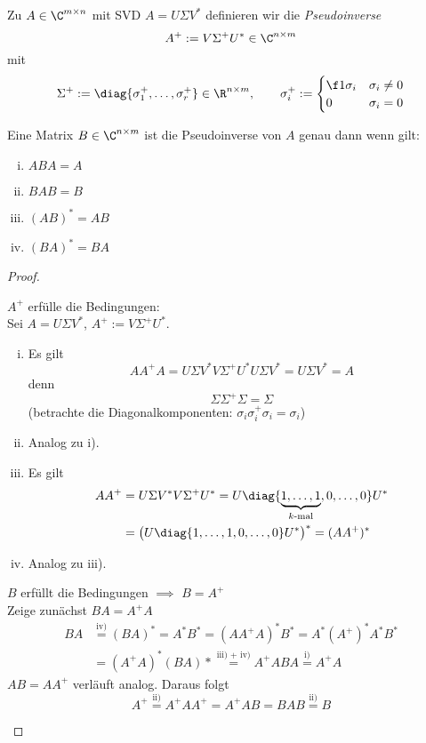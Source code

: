 \documentclass[11pt]{scrbook}
\begin{document}
\begin{df}[Pseudoinverse]
	\label{1.39}	
	Zu $A\in \C^{m\times n}$ mit SVD $A=U\Sigma V^*$ definieren wir die \emph{Pseudoinverse}
	\[
		A^+ := V \Sigma^+ U^* \in \C^{n\times m}
	\]
	mit
	\[
		\Sigma^+ := \diag\{\sigma_1^+,\dotsc, \sigma_r^+\} \in \R^{n\times m}
		,\qquad \sigma_i^+ := \begin{cases}
			\f 1{\sigma_i}	& \sigma_i \neq 0 \\
			0 & \sigma_i = 0
		\end{cases}
	\]
\end{df}

\begin{st}
	\label{1.40}
	Eine Matrix $B\in \C^{n\times m}$ ist die Pseudoinverse von $A$ genau dann wenn gilt:
	\begin{enumerate}[i)]
		\item
			$ABA = A$
		\item
			$BAB = B$
		\item
			$(AB)^* = AB$
		\item
			$(BA)^* = BA$
	\end{enumerate}
	\begin{proof}
		\begin{seg}{$A^+$ erfülle die Bedingungen:} \\
			Sei $A=U\Sigma V^*$, $A^+ := V\Sigma^+U^*$.
			\begin{enumerate}[i)]
				\item
					Es gilt
					\[
						AA^+A = U\Sigma V^* V \Sigma^+ U^* U \Sigma V^* = U\Sigma V^* = A
					\]
					denn
					\[
						\Sigma \Sigma^+ \Sigma = \Sigma
					\]
					(betrachte die Diagonalkomponenten: $\sigma_i \sigma_i^+ \sigma_i = \sigma_i$)
				\item
					Analog zu i).
				\item
					Es gilt
					\begin{align*}
						AA^+ &= U \Sigma V^* V \Sigma^+ U^* = U \diag\{\underbrace{1,\dotsc,1}_{k\text{-mal}},0,\dotsc, 0\} U^*\\ &= \big(U \diag\{1,\dotsc,1,0,\dotsc,0\} U^*\big)^* = (AA^+)^*
					\end{align*}
				\item
					Analog zu iii).
			\end{enumerate}
		\end{seg}
		\begin{seg}{$B$ erfüllt die Bedingungen $\implies$ $B=A^+$} \\
			Zeige zunächst $BA=A^+A$
			\begin{align*}
				BA &\stackrel{\text{iv)}}= (BA)^* = A^*B^* = (AA^+A)^*B^* = A^*(A^+)^*A^*B^*\\ &= (A^+A)^*(BA)* \stackrel{\text{iii) + iv)}}= A^+ABA \stackrel{\text{i)}} = A^+A
			\end{align*}
			$AB=AA^+$ verläuft analog.
			Daraus folgt
			\[
				A^+ \stackrel{\text{ii)}}= A^+AA^+ = A^+AB = BAB \stackrel{\text{ii)}}= B 
			\]
		\end{seg}
	\end{proof}
\end{st}
\end{document}
